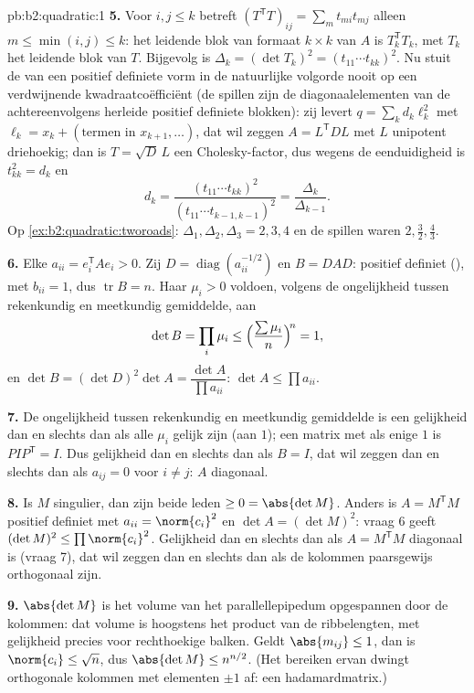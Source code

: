 \begin{solution}{pb:b2:quadratic:1}
\textbf{5.} Voor $i, j \leq k$ betreft $(T^{\mathsf T}T)_{ij} =
\sum_m t_{mi}t_{mj}$ alleen $m \leq \min(i,j) \leq k$: het leidende
blok van formaat $k\times k$ van $A$ is $T_k^{\mathsf T}T_k$, met
$T_k$ het leidende blok van $T$. Bijgevolg is $\Delta_k = (\det
T_k)^2 = (t_{11}\cdots t_{kk})^2$. Nu stuit de  van
een positief definiete vorm in de natuurlijke volgorde nooit op een
verdwijnende kwadraatcoëfficiënt (de spillen zijn de
diagonaalelementen van de achtereenvolgens herleide positief
definiete blokken): zij levert $q = \sum_k d_k\ell_k^2$ met
$\ell_k = x_k + (\text{termen in } x_{k+1}, \dots)$, dat wil zeggen
$A = L^{\mathsf T}DL$ met $L$ unipotent driehoekig; dan is $T =
\sqrt D\,L$ een Cholesky-factor, dus wegens de eenduidigheid is
$t_{kk}^2 = d_k$ en
\[
d_k = \frac{(t_{11}\cdots t_{kk})^2}
{(t_{11}\cdots t_{k-1,k-1})^2}
= \frac{\Delta_k}{\Delta_{k-1}} .
\]
Op \cref{ex:b2:quadratic:tworoads}: $\Delta_1, \Delta_2,
\Delta_3 = 2, 3, 4$ en de spillen waren $2, \frac32, \frac43$.

\textbf{6.} Elke $a_{ii} = e_i^{\mathsf T}Ae_i > 0$. Zij $D =
\operatorname{diag}(a_{ii}^{-1/2})$ en $B = DAD$: positief definiet
(), met $b_{ii} = 1$, dus $\operatorname{tr} B = n$.
Haar  $\mu_i > 0$ voldoen, volgens de ongelijkheid
tussen rekenkundig en meetkundig gemiddelde, aan
\[
\det B = \prod_i\mu_i
\leq \Bigl(\frac{\sum\mu_i}{n}\Bigr)^{\!n} = 1 ,
\]
en $\det B = (\det D)^2\det A = \dfrac{\det A}{\prod
a_{ii}}$: $\det A \leq \prod a_{ii}$.

\textbf{7.} De ongelijkheid tussen rekenkundig en meetkundig
gemiddelde is een gelijkheid dan en slechts dan als alle $\mu_i$
gelijk zijn (aan $1$); een  matrix met als enige
 $1$ is $PIP^{\mathsf T} = I$. Dus gelijkheid dan en
slechts dan als $B = I$, dat wil zeggen dan en slechts dan als
$a_{ij} = 0$ voor $i \neq j$: $A$ diagonaal.

\textbf{8.} Is $M$ singulier, dan zijn beide leden $\geq 0 =
\abs{\det M}$. Anders is $A = M^{\mathsf T}M$ positief definiet
met $a_{ii} = \norm{c_i}^2$ en $\det A = (\det M)^2$: vraag 6 geeft
$(\det M)^2 \leq \prod\norm{c_i}^2$. Gelijkheid dan en slechts dan
als $A = M^{\mathsf T}M$ diagonaal is (vraag 7), dat wil zeggen dan
en slechts dan als de kolommen paarsgewijs orthogonaal zijn.

\textbf{9.} $\abs{\det M}$ is het volume van het parallellepipedum
opgespannen door de kolommen: dat volume is hoogstens het product
van de ribbelengten, met gelijkheid precies voor rechthoekige
balken. Geldt $\abs{m_{ij}} \leq 1$, dan is $\norm{c_i} \leq
\sqrt n$, dus $\abs{\det M} \leq n^{n/2}$. (Het bereiken ervan
dwingt orthogonale kolommen met elementen $\pm1$ af: een
hadamardmatrix.)


\end{solution}
